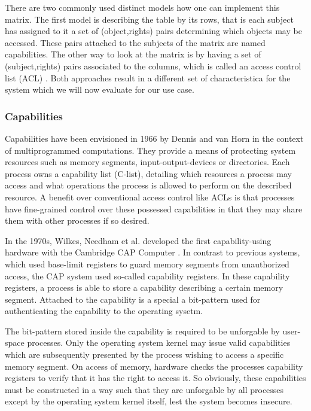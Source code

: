 
There are two commonly used distinct models how one can implement this matrix.
The first model is describing the table by its rows, that is each subject has assigned to it a set of (object,rights) pairs determining which objects may be accessed.
These pairs attached to the subjects of the matrix are named capabilities.
The other way to look at the matrix is by having a set of (subject,rights) pairs associated to the columns, which is called an access control list (ACL) \cite{tanenbaum2014modern}.
Both approaches result in a different set of characteristica for the system which we will now evaluate for our use case.

\subsubsection{Capabilities}

\cite{dennis1966programming}

Capabilities have been envisioned in 1966 by Dennis and van Horn \cite{dennis1966programming} in the context of multiprogrammed computations.
They provide a means of protecting system resources such as memory segments, input-output-devices or directories.
Each process owns a capability list (C-list), detailing which resources a process may access and what operations the process is allowed to perform on the described resource.
A benefit over conventional access control like ACLs is that processes have fine-grained control over these possessed capabilities in that they may share them with other processes if so desired.

In the 1970s, Wilkes, Needham et al. developed the first capability-using hardware with the Cambridge CAP Computer \cite{wilkes1979cambridge}.
In contrast to previous systems, which used base-limit registers to guard memory segments from unauthorized access, the CAP system used so-called capability registers.
In these capability registers, a process is able to store a capability describing a certain memory segment.
Attached to the capability is a special a bit-pattern used for authenticating the capability to the operating sysetm.

The bit-pattern stored inside the capability is required to be unforgable by user-space processes.
Only the operating system kernel may issue valid capabilities which are subsequently presented by the process wishing to access a specific memory segment.
On access of memory, hardware checks the processes capability registers to verify that it has the right to access it.
So obviously, these capabilities must be constructed in a way such that they are unforgable by all processes except by the operating system kernel itself, lest the system becomes insecure.

